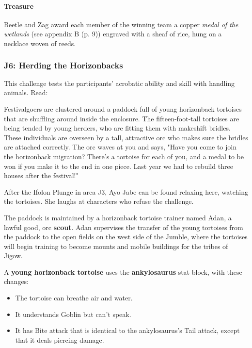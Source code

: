 \documentclass[a4paper, 11pt, bg=full, twocolumn, nooutline]{dndbook}
\begin{document}
\paragraph{Treasure}

Beetle and Zag award each member of the winning team a copper \textit{medal of the wetlands} (see appendix B (p. 9)) engraved with a sheaf of rice, hung on a necklace woven of reeds.

\subsubsection{J6: Herding the Horizonbacks}

This challenge tests the participants' acrobatic ability and skill with handling animals. Read:

\begin{DndReadAloud}
Festivalgoers are clustered around a paddock full of young horizonback tortoises that are shuffling around inside the enclosure. The fifteen-foot-tall tortoises are being tended by young herders, who are fitting them with makeshift bridles. These individuals are overseen by a tall, attractive orc who makes sure the bridles are attached correctly.
The orc waves at you and says, "Have you come to join the horizonback migration? There's a tortoise for each of you, and a medal to be won if you make it to the end in one piece. Last year we had to rebuild three houses after the festival!"
\end{DndReadAloud}

After the Ifolon Plunge in area J3, Ayo Jabe can be found relaxing here, watching the tortoises. She laughs at characters who refuse the challenge.

The paddock is maintained by a horizonback tortoise trainer named Adan, a lawful good, orc \textbf{scout}. Adan supervises the transfer of the young tortoises from the paddock to the open fields on the west side of the Jumble, where the tortoises will begin training to become mounts and mobile buildings for the tribes of Jigow.

A \textbf{young horizonback tortoise} uses the \textbf{ankylosaurus} stat block, with these changes:

\begin{itemize}
\item The tortoise can breathe air and water.
\item It understands Goblin but can't speak.
\item It has Bite attack that is identical to the ankylosaurus's Tail attack, except that it deals piercing damage.
\end{itemize}
\end{document}
